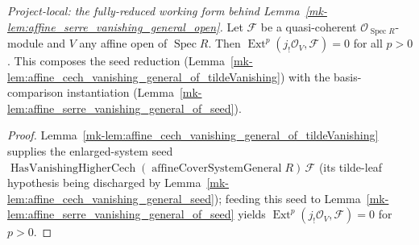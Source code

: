 \begin{lemma}\label{mk-lem:affine_serre_vanishing_general_of_tildeVanishing}
  \leanok

  \textit{Project-local: the fully-reduced working form behind
  Lemma~\ref{mk-lem:affine_serre_vanishing_general_open}.}
  Let \(\mathcal{F}\) be a quasi-coherent \(\mathcal{O}_{\operatorname{Spec} R}\)-module and \(V\) any affine
  open of \(\operatorname{Spec} R\). Then \(\operatorname{Ext}^p(j_!\mathcal{O}_V, \mathcal{F}) = 0\) for all
  \(p > 0\). This composes the seed reduction
  (Lemma~\ref{mk-lem:affine_cech_vanishing_general_of_tildeVanishing}) with the basis-comparison
  instantiation (Lemma~\ref{mk-lem:affine_serre_vanishing_general_of_seed}).
\end{lemma}
\begin{proof}
  \leanok
    Lemma~\ref{mk-lem:affine_cech_vanishing_general_of_tildeVanishing} supplies the enlarged-system seed
  \(\operatorname{HasVanishingHigherCech}(\operatorname{affineCoverSystemGeneral} R)\, \mathcal{F}\) (its
  tilde-leaf hypothesis being discharged by Lemma~\ref{mk-lem:affine_cech_vanishing_general_seed}); feeding
  this seed to Lemma~\ref{mk-lem:affine_serre_vanishing_general_of_seed} yields
  \(\operatorname{Ext}^p(j_!\mathcal{O}_V, \mathcal{F}) = 0\) for \(p > 0\).
\end{proof}

